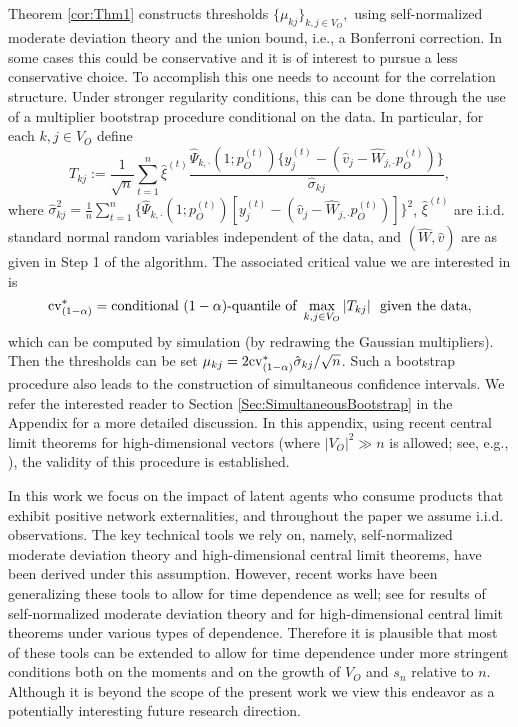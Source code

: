 \documentclass[opre,nonblindrev]{informs3} %
\begin{document}
{
\begin{remark}
Theorem \ref{cor:Thm1} constructs 
thresholds $\{\mu_{kj}\}_{ k,j\in V_O},$ 
using  self-normalized moderate deviation theory and the union bound, i.e., a Bonferroni correction. In some cases this could be conservative and it is  of interest to pursue a less conservative choice. To accomplish this one needs to account for the correlation structure. Under stronger regularity conditions, this can be done through the use of a multiplier bootstrap procedure conditional on the data. In particular, for each $k,j\in V_O$ define
$$ T_{kj} := \frac{1}{\sqrt{n}}\sum_{t=1}^n \hat\xi^{(t)} \frac{\hat \Psi_{k,\cdot}(1;p_O^{(t)})\{ y_j^{(t)} - (\hat v_j - \hat W_{j,\cdot} p_O^{(t)})\}}{\hat\sigma_{kj}}, $$
where $\hat\sigma_{kj}^2 = \frac{1}{n}\sum_{t=1}^n \{\hat \Psi_{k,\cdot}(1;{p}_O^{(t)})[ y_j^{(t)} - (\hat v_j - \hat W_{j,\cdot} p_O^{(t)})]\}^2$, $\hat\xi^{(t)}$ are i.i.d. standard normal random variables
independent of the data,
and $(\hat W, \hat v) $ are as given in Step 1 of the algorithm.
 The associated critical value we are interested in is
$$ {\rm cv}^*_{(1-\alpha)} = \mbox{conditional} \  (1-\alpha)\mbox{-quantile of} \ \max_{k,j\in V_O} |T_{kj} | \ \ \mbox{given the data},$$
which can be computed by simulation (by redrawing the Gaussian multipliers). Then 
the thresholds can be set   $\mu_{kj} = 2 {\rm cv}^*_{(1-\alpha)} \hat\sigma_{kj}/\sqrt{n}$. Such a bootstrap procedure also leads to the construction of simultaneous confidence intervals.  We refer the interested reader to Section \ref{Sec:SimultaneousBootstrap} in the Appendix for a more detailed discussion.
In this appendix, using  recent central limit theorems for high-dimensional vectors (where $|V_O|^2 \gg n$ is allowed; see, e.g., \citet{chernozhukov2012gaussian,chernozhukov2013gaussian}),
the validity of this procedure is established.
	\hfill \Halmos
\end{remark}


\begin{remark}
In this work we focus on the impact of latent agents 
who consume products that exhibit positive network externalities,  and throughout the paper we assume i.i.d. observations. The key technical tools we rely on, namely, self-normalized moderate deviation theory and  high-dimensional central limit theorems, have been derived under this assumption. 
However, recent works have been generalizing these tools to allow for time dependence as well; see \cite{chen2016self} for results of self-normalized moderate deviation theory and  \cite{chernozhukov2013testing,zhang2014bootstrapping,zhang2017gaussian,BelloniOliveira2018} for high-dimensional central limit theorems under various types of dependence. Therefore it is plausible that most of these tools can be extended to allow for time dependence under more stringent conditions both on the moments and on the growth of $V_O$ and $s_n$ relative to $n$. Although it is beyond the scope of the present work we view this endeavor as a potentially interesting future research direction.
	\hfill \Halmos
\end{remark}}
\end{document}
